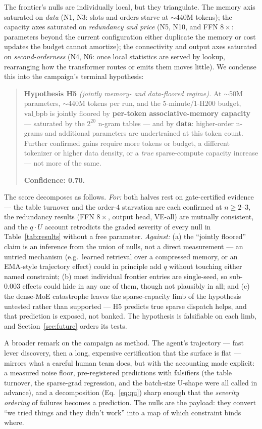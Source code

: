 \documentclass{article}
\newcommand{\valbpb}{\mathrm{val\_bpb}}
\begin{document}
The frontier's nulls are individually local, but they triangulate. The memory axis saturated on \emph{data} (N1, N3: slots and orders starve at $\sim$440M tokens); the capacity axes saturated on \emph{redundancy and price} (N5, N10, and FFN $8\times$: parameters beyond the current configuration either duplicate the memory or cost updates the budget cannot amortize); the connectivity and output axes saturated on \emph{second-orderness} (N4, N6: once local statistics are served by lookup, rearranging how the transformer routes or emits them moves little). We condense this into the campaign's terminal hypothesis:

\begin{quote}
\textbf{Hypothesis H5} \emph{(jointly memory- and data-floored regime).} At $\sim$50M parameters, $\sim$440M tokens per run, and the 5-minute/1-H200 budget, $\valbpb$ is jointly floored by \textbf{per-token associative-memory capacity} --- saturated by the $2^{20}$ n-gram tables --- and by \textbf{data}: higher-order n-grams and additional parameters are undertrained at this token count. Further confirmed gains require more tokens or budget, a different tokenizer or higher data density, or a \emph{true} sparse-compute capacity increase --- not more of the same.

\textbf{Confidence: 0.70.}
\end{quote}

The score decomposes as follows. \emph{For:} both halves rest on gate-certified evidence --- the table turnover and the order-4 starvation are each confirmed at $n \geq 2$--3, the redundancy results (FFN $8\times$, output head, VE-all) are mutually consistent, and the $q \cdot U$ account retrodicts the graded severity of every null in Table~\ref{tab:results} without a free parameter. \emph{Against:} (a) the ``jointly floored'' claim is an inference from the union of nulls, not a direct measurement --- an untried mechanism (e.g.\ learned retrieval over a compressed memory, or an EMA-style trajectory effect) could in principle add $q$ without touching either named constraint; (b) most individual frontier entries are single-seed, so sub-$0.003$ effects could hide in any one of them, though not plausibly in all; and (c) the dense-MoE catastrophe leaves the sparse-capacity limb of the hypothesis untested rather than supported --- H5 predicts true sparse dispatch helps, and that prediction is exposed, not banked. The hypothesis is falsifiable on each limb, and Section~\ref{sec:future} orders its tests.

A broader remark on the campaign as method. The agent's trajectory --- fast lever discovery, then a long, expensive certification that the surface is flat --- mirrors what a careful human team does, but with the accounting made explicit: a measured noise floor, pre-registered predictions with falsifiers (the table turnover, the sparse-grad regression, and the batch-size U-shape were all called in advance), and a decomposition (Eq.~\ref{eq:qu}) sharp enough that the \emph{severity ordering} of failures becomes a prediction. The nulls are the payload: they convert ``we tried things and they didn't work'' into a map of which constraint binds where.
\end{document}
